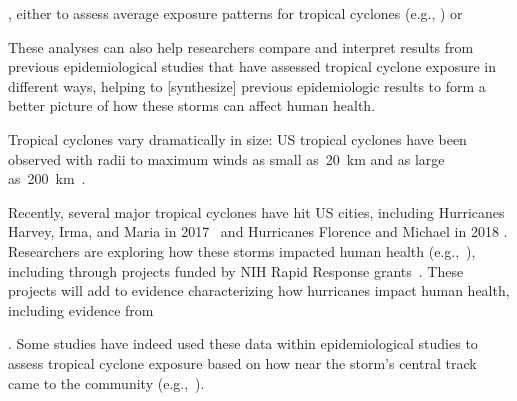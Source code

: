 , either to assess average
exposure patterns for tropical cyclones (e.g., \cite{zandbergen2009}) or 

These analyses can also help
researchers compare and interpret results from previous epidemiological studies
that have assessed tropical cyclone exposure in different ways, helping to
[synthesize] previous epidemiologic results to form a better picture of how
these storms can affect human health. 

Tropical cyclones vary
dramatically in size: \ac{US} tropical cyclones have been observed with radii
to maximum winds as small as~20~\si{\kilo\metre} and as large
as~200~\si{\kilo\metre}~\parencite{mallin2006, quiring2011variations}.  

Recently, several major tropical cyclones have hit \ac{US} cities, including
Hurricanes Harvey, Irma, and Maria in 2017~\parencite{blake20182017} and
Hurricanes Florence and Michael in 2018 \parencite{avila20192018}. Researchers
are exploring how these storms impacted human health
(e.g.,~\cite{santos2018use, rivera2018estimating, santos2018differential,
grineski2019impact, issa2018deaths, tanz2019notes, paul2019brief}), including
through projects funded by \ac{NIH} Rapid Response
grants~\parencite{nihreporter}. These projects will add to evidence
characterizing how hurricanes impact human health, including evidence from

. Some studies have
indeed used these data within epidemiological studies to assess tropical cyclone
exposure based on how near the storm's central track came to the community
(e.g.,~\cite{currie2013, kinney2008, caillouet2008increase}).

